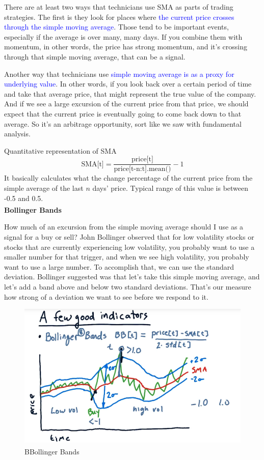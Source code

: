 \documentclass[12pt]{article}
\begin{document}
There are at least two ways that technicians use SMA as parts of trading strategies. The first is they look for places where \textcolor{blue}{the current price crosses through the simple moving average}. Those tend to be important events, especially if the average is over many, many days. If you combine them with momentum, in other words, the price has strong momentum, and it's crossing through that simple moving average, that can be a signal. 

Another way that technicians use \textcolor{blue}{simple moving average is as a proxy for underlying value}. In other words, if you look back over a certain period of time and take that average price, that might represent the true value of the company. And if we see a large excursion of the current price from that price, we should expect that the current price is eventually going to come back down to that average. So it's an arbitrage opportunity, sort like we saw with fundamental analysis. 

Quantitative representation of SMA 
\begin{equation}
\text{SMA[t]} = \frac{\text{price[t]}}{\text{price[t-n:t].mean()}} - 1
\end{equation}
It basically calculates what the change percentage of the current price from the simple average of the last $n$ days' price. Typical range of this value is between -0.5 and 0.5. \\[8pt]
\noindent
\textbf{Bollinger Bands\textsuperscript\textregistered} 

How much of an excursion from the simple moving average should I use as a signal for a buy or sell? John Bollinger observed that for low volatility stocks or stocks that are currently experiencing low volatility, you probably want to use a smaller number for that trigger, and when we see high volatility, you probably want to use a large number. To accomplish that, we can use the standard deviation. Bollinger suggested was that let's take this simple moving average, and let's add a band above and below two standard deviations. That's our measure how strong of a deviation we want to see before we respond to it. 

\begin{figure}[!ht]
\centering
\includegraphics[scale=0.45]{fig/fig48}
\caption{BBollinger Bands\textsuperscript\textregistered}
\end{figure}
\end{document}
